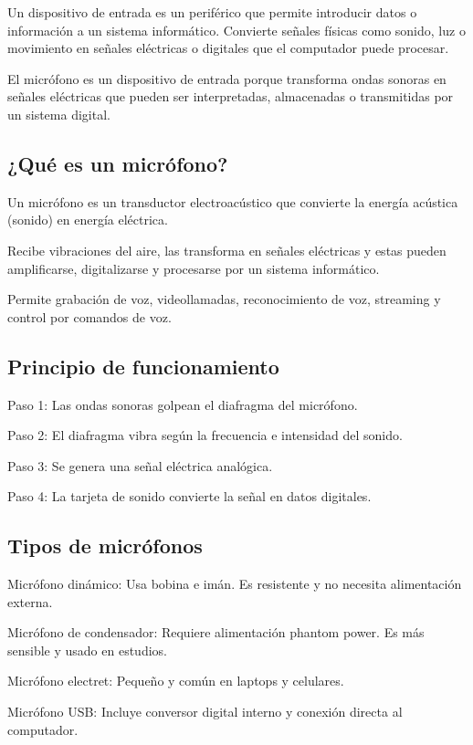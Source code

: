 \documentclass[12pt, letterpaper]{article}
\begin{document}
Un dispositivo de entrada es un periférico que permite introducir datos o información a un sistema informático.
Convierte señales físicas como sonido, luz o movimiento en señales eléctricas o digitales que el computador puede procesar.

El micrófono es un dispositivo de entrada porque transforma ondas sonoras en señales eléctricas que pueden ser interpretadas,
almacenadas o transmitidas por un sistema digital.

\subsection{¿Qué es un micrófono?}

Un micrófono es un transductor electroacústico que convierte la energía acústica (sonido) en energía eléctrica.

Recibe vibraciones del aire, las transforma en señales eléctricas y estas pueden amplificarse, digitalizarse y procesarse
por un sistema informático.

Permite grabación de voz, videollamadas, reconocimiento de voz, streaming y control por comandos de voz.

\subsection{Principio de funcionamiento}

Paso 1: Las ondas sonoras golpean el diafragma del micrófono.

Paso 2: El diafragma vibra según la frecuencia e intensidad del sonido.

Paso 3: Se genera una señal eléctrica analógica.

Paso 4: La tarjeta de sonido convierte la señal en datos digitales.

\subsection{Tipos de micrófonos}

Micrófono dinámico: Usa bobina e imán. Es resistente y no necesita alimentación externa.

Micrófono de condensador: Requiere alimentación phantom power. Es más sensible y usado en estudios.

Micrófono electret: Pequeño y común en laptops y celulares.

Micrófono USB: Incluye conversor digital interno y conexión directa al computador.
\end{document}
